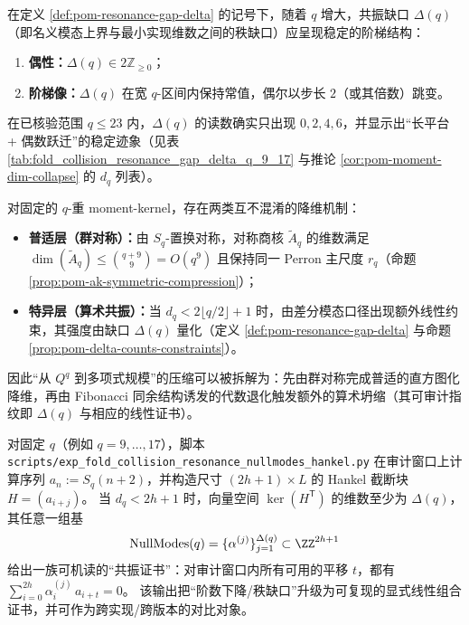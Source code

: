 

\begin{conjecture}\label{conj:pom-delta-staircase}
在定义 \ref{def:pom-resonance-gap-delta} 的记号下，随着 \(q\) 增大，共振缺口 \(\Delta(q)\)（即名义模态上界与最小实现维数之间的秩缺口）应呈现稳定的阶梯结构：
\begin{enumerate}
  \item \textbf{偶性：}\(\Delta(q)\in 2\mathbb{Z}_{\ge 0}\)；
  \item \textbf{阶梯像：}\(\Delta(q)\) 在宽 \(q\)-区间内保持常值，偶尔以步长 \(2\)（或其倍数）跳变。
\end{enumerate}
在已核验范围 \(q\le 23\) 内，\(\Delta(q)\) 的读数确实只出现 \(0,2,4,6\)，并显示出“长平台 + 偶数跃迁”的稳定迹象（见表 \ref{tab:fold_collision_resonance_gap_delta_q_9_17} 与推论 \ref{cor:pom-moment-dim-collapse} 的 \(d_q\) 列表）。
\end{conjecture}

\begin{remark}\label{rem:pom-two-layer-dim-reduction}
对固定的 \(q\)-重 moment-kernel，存在两类互不混淆的降维机制：
\begin{itemize}
  \item \textbf{普适层（群对称）：}由 \(S_q\)-置换对称，对称商核 \(\widetilde A_q\) 的维数满足
  \(
  \dim(\widetilde A_q)\le \binom{q+9}{9}=O(q^9)
  \)
  且保持同一 Perron 主尺度 \(r_q\)（命题 \ref{prop:pom-ak-symmetric-compression}）；
  \item \textbf{特异层（算术共振）：}当 \(d_q<2\lfloor q/2\rfloor+1\) 时，由差分模态口径出现额外线性约束，其强度由缺口 \(\Delta(q)\) 量化（定义 \ref{def:pom-resonance-gap-delta} 与命题 \ref{prop:pom-delta-counts-constraints}）。
\end{itemize}
因此“从 \(Q^q\) 到多项式规模”的压缩可以被拆解为：先由群对称完成普适的直方图化降维，再由 Fibonacci 同余结构诱发的代数退化触发额外的算术坍缩（其可审计指纹即 \(\Delta(q)\) 与相应的线性证书）。
\end{remark}

\begin{remark}\label{rem:pom-nullmodes-algorithm}
对固定 \(q\)（例如 \(q=9,\dots,17\)），脚本 \texttt{scripts/exp\_fold\_collision\_resonance\_nullmodes\_hankel.py} 在审计窗口上计算序列 \(a_n:=S_q(n+2)\)，并构造尺寸 \((2h+1)\times L\) 的 Hankel 截断块 \(H=(a_{i+j})\)。
当 \(d_q<2h+1\) 时，向量空间 \(\ker(H^{\mathsf T})\) 的维数至少为 \(\Delta(q)\)，其任意一组基
\[
\mathrm{NullModes}(q)=\{\alpha^{(j)}\}_{j=1}^{\Delta(q)}\subset\ZZ^{2h+1}
\]
给出一族可机读的“共振证书”：对审计窗口内所有可用的平移 \(t\)，都有
\(
\sum_{i=0}^{2h}\alpha^{(j)}_i\,a_{i+t}=0
\)。
该输出把“阶数下降/秩缺口”升级为可复现的显式线性组合证书，并可作为跨实现/跨版本的对比对象。
\end{remark}

